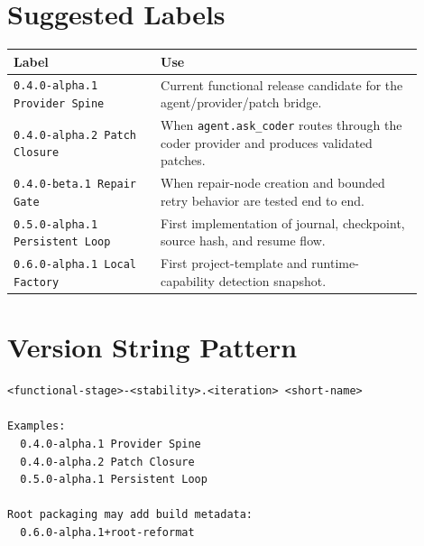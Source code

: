 \documentclass[11pt,a4paper]{article}
\begin{document}
\section*{Suggested Labels}

\begin{longtable}{@{}p{0.32\linewidth}p{0.58\linewidth}@{}}
\toprule
Label & Use \\
\midrule
\texttt{0.4.0-alpha.1 Provider Spine} & Current functional release candidate for the agent/provider/patch bridge. \\
\texttt{0.4.0-alpha.2 Patch Closure} & When \texttt{agent.ask\_coder} routes through the coder provider and produces validated patches. \\
\texttt{0.4.0-beta.1 Repair Gate} & When repair-node creation and bounded retry behavior are tested end to end. \\
\texttt{0.5.0-alpha.1 Persistent Loop} & First implementation of journal, checkpoint, source hash, and resume flow. \\
\texttt{0.6.0-alpha.1 Local Factory} & First project-template and runtime-capability detection snapshot. \\
\bottomrule
\end{longtable}

\section*{Version String Pattern}

\begin{lstlisting}[language={}]
<functional-stage>-<stability>.<iteration> <short-name>

Examples:
  0.4.0-alpha.1 Provider Spine
  0.4.0-alpha.2 Patch Closure
  0.5.0-alpha.1 Persistent Loop

Root packaging may add build metadata:
  0.6.0-alpha.1+root-reformat
\end{lstlisting}
\end{document}
